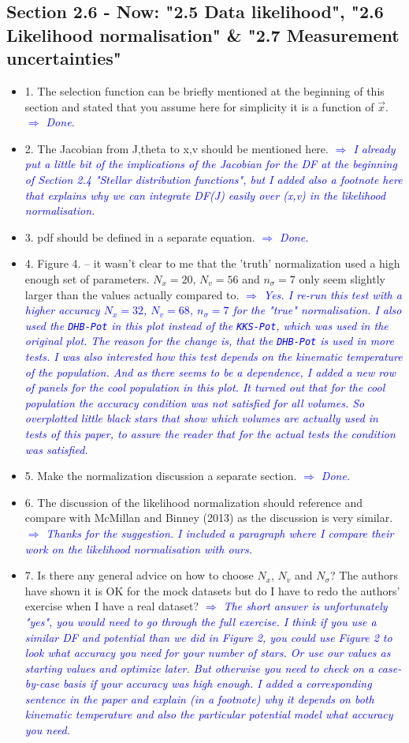 \documentclass[10pt,a4paper]{article}
\newcommand{\Comment}[1]{\textsl{\textcolor{Blue}{$\Longrightarrow$ {#1}}}}
\begin{document}
\subsection{Section 2.6 - Now: "2.5 Data likelihood", "2.6 Likelihood normalisation" \& "2.7 Measurement uncertainties"}
\begin{itemize}
\item 1. The selection function can be briefly mentioned at the beginning of this section and stated that you assume here for simplicity it is a function of $\vec{x}$. \Comment{Done.}
\item 2. The Jacobian from J,theta to x,v should be mentioned here. \Comment{I already put a little bit of the implications of the Jacobian for the DF at the beginning of Section 2.4 "Stellar distribution functions", but I added also a footnote here that explains why we can integrate DF(J) easily over (x,v) in the likelihood normalisation.}
\item 3. pdf should be defined in a separate equation. \Comment{Done.}
\item 4. Figure 4. -- it wasn't clear to me that the 'truth' normalization used a high enough set of parameters. $N_x=20$, $N_v=56$ and $n_\sigma=7$ only seem slightly larger than the values actually compared to. \Comment{Yes. I re-run this test with a higher accuracy $N_x=32$, $N_v = 68$, $n_\sigma = 7$ for the "true" normalisation.  I also used the \texttt{DHB-Pot} in this plot instead of the \texttt{KKS-Pot}, which was used in the original plot. The reason for the change is, that the \texttt{DHB-Pot} is used in more tests. I was also interested how this test depends on the kinematic temperature of the population. And as there seems to be a dependence, I added a new row of panels for the cool population in this plot. It turned out that for the cool population the accuracy condition was not satisfied for all volumes. So overplotted little black stars that show which volumes are actually used in tests of this paper, to assure the reader that for the actual tests the condition was satisfied.}
\item 5. Make the normalization discussion a separate section. \Comment{Done.}
\item 6. The discussion of the likelihood normalization should reference and compare with McMillan and Binney (2013) as the discussion is very similar. \Comment{Thanks for the suggestion. I included a paragraph where I compare their work on the likelihood normalisation with ours.}
\item 7. Is there any general advice on how to choose $N_x$, $N_v$ and $N_\sigma$? The authors have shown it is OK for the mock datasets but do I have to redo the authors' exercise when I have a real dataset? \Comment{The short answer is unfortunately "yes", you would need to go through the full exercise. I think if you use a similar DF and potential than we did in Figure 2, you could use Figure 2 to look what accuracy you need for your number of stars. Or use our values as starting values and optimize later. But otherwise you need to check on a case-by-case basis if your accuracy was high enough. I added a corresponding sentence in the paper and explain (in a footnote) why it depends on both kinematic temperature and also the particular potential model what accuracy you need.}

\end{itemize}
\end{document}
